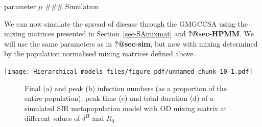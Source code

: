 \documentclass[
  letterpaper,
  DIV=11,
  numbers=noendperiod]{scrartcl}
\begin{document}
parameter \(\mu\) \#\#\# Simulation

We can now simulate the spread of disease through the GMGCCSA using the
mixing matrices presented in Section~\ref{sec-SAmixmat} and
\textbf{?@sec-HPMM}. We will use the same parameters as in
\textbf{?@sec-sim}, but now with mixing determined by the population
normalised mixing matrices defined above.

\texttt{[image: Hierarchical\_models\_files/figure-pdf/unnamed-chunk-10-1.pdf]}

\begin{figure}

\begin{minipage}[t]{0.50\linewidth}

{\centering 


}

\subcaption{\label{fig-SA3_OD_outcomes-1}}
\end{minipage}%
%
\begin{minipage}[t]{0.50\linewidth}

{\centering 


}

\subcaption{\label{fig-SA3_OD_outcomes-2}}
\end{minipage}%
\newline
\begin{minipage}[t]{0.50\linewidth}

{\centering 


}

\subcaption{\label{fig-SA3_OD_outcomes-3}}
\end{minipage}%
%
\begin{minipage}[t]{0.50\linewidth}

{\centering 


}

\subcaption{\label{fig-SA3_OD_outcomes-4}}
\end{minipage}%

\caption{\label{fig-SA3_OD_outcomes}Final (a) and peak (b) infection
numbers (as a proportion of the entire population), peak time (c) and
total duration (d) of a simulated SIR metapopulation model with OD
mixing matrix at different values of \(\delta^H\) and \(R_0\)}

\end{figure}
\end{document}
